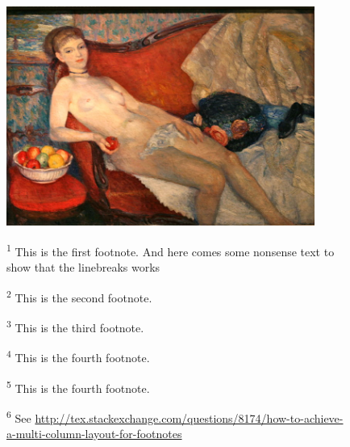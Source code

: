 \begin{figure}

\centering
\includegraphics[height=0.5\textheight, width=0.9\textwidth, keepaspectratio]{./images/nudewithapple.jpg}
\vspace{3\baselineskip}
\footnoterule\footnotesize
\begin{minipage}[t]{0.49\linewidth}
\textsuperscript{1} This is the first footnote. And here comes some nonsense text
                    to show that the linebreaks works \par
\textsuperscript{2} This is the second footnote.\par
\end{minipage}\hfill
\begin{minipage}[t]{0.49\linewidth}
\textsuperscript{3} This is the third footnote. \par
\textsuperscript{4} This is the fourth footnote.\par
\textsuperscript{5} This is the fourth footnote.\par
\textsuperscript{6} See \url{http://tex.stackexchange.com/questions/8174/how-to-achieve-a-multi-column-layout-for-footnotes}\par
\end{minipage}
\end{figure}




\clearpage

